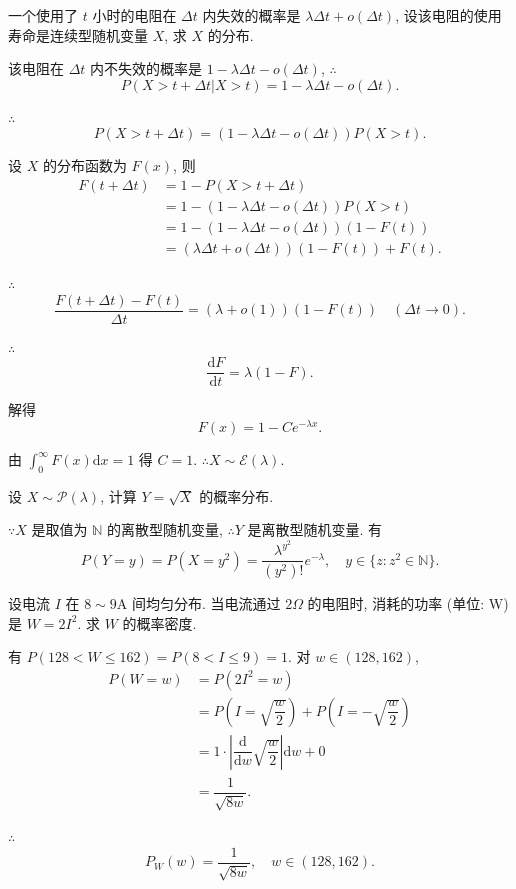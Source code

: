 \documentclass[color=black,device=normal,lang=cn]{elegantnote}
\numberwithin{equation}{section}
\theoremstyle{plain}
\numberwithin{exercise}{exsection}
\begin{document}
\addtocounter{exercise}{3}
\begin{exercise}%
    一个使用了 $t$ 小时的电阻在 $\Delta t$ 内失效的概率是 $\lambda\Delta t+o(\Delta t)$, 设该电阻的使用寿命是连续型随机变量 $X$, 求 $X$ 的分布.
\end{exercise}
\begin{solution}
    该电阻在 $\Delta t$ 内不失效的概率是 $1-\lambda\Delta t-o(\Delta t)$, $\therefore$
    \[P(X>t+\Delta t|X>t)=1-\lambda\Delta t-o(\Delta t).\]

    $\therefore$
    \[P(X>t+\Delta t)=(1-\lambda\Delta t-o(\Delta t))P(X>t).\]

    设 $X$ 的分布函数为 $F(x)$, 则
    \begin{align*}
        F(t+\Delta t) & =1-P(X>t+\Delta t) \\
        & =1-(1-\lambda\Delta t-o(\Delta t))P(X>t) \\
        & =1-(1-\lambda\Delta t-o(\Delta t))(1-F(t)) \\
        & =(\lambda\Delta t+o(\Delta t))(1-F(t))+F(t).
    \end{align*}

    $\therefore$
    \[\dfrac{F(t+\Delta t)-F(t)}{\Delta t}=(\lambda+o(1))(1-F(t))\quad(\Delta t\to0).\]

    $\therefore$
    \[\dfrac{\mathrm{d}F}{\mathrm{d}t}=\lambda(1-F).\]

    解得
    \[F(x)=1-Ce^{-\lambda x}.\]

    由 $\int_0^\infty F(x)\mathrm{d}x=1$ 得 $C=1$. $\therefore X\sim\mathcal{E}(\lambda)$.
\end{solution}
\begin{exercise}%
    设 $X\sim\mathcal{P}(\lambda)$, 计算 $Y=\sqrt{X}$ 的概率分布.
\end{exercise}
\begin{solution}
    $\because X$ 是取值为 $\mathbb{N}$ 的离散型随机变量, $\therefore Y$ 是离散型随机变量. 有
    \[P(Y=y)=P(X=y^2)=\dfrac{\lambda^{y^2}}{(y^2)!}e^{-\lambda},\quad y\in\{z:z^2\in\mathbb{N}\}.\]
\end{solution}
\begin{exercise}%
    设电流 $I$ 在 $8\sim 9\text{A}$ 间均匀分布. 当电流通过 $2\Omega$ 的电阻时, 消耗的功率 (单位: W) 是 $W=2I^2$. 求 $W$ 的概率密度.
\end{exercise}
\begin{solution}
    有 $P(128<W\leq162)=P(8<I\leq9)=1$. 对 $w\in(128,162)$,
    \begin{align*}
        P(W=w) & =P(2I^2=w) \\
        & =P\left(I=\sqrt{\dfrac{w}{2}}\right)+P\left(I=-\sqrt{\dfrac{w}{2}}\right) \\
        & =1\cdot\left|\dfrac{\mathrm{d}}{\mathrm{d}w}\sqrt{\dfrac{w}{2}}\right|\mathrm{d}w+0 \\
        & =\dfrac{1}{\sqrt{8w}}.
    \end{align*}

    $\therefore$
    \[P_W(w)=\dfrac{1}{\sqrt{8w}},\quad w\in(128,162).\]
\end{solution}
\end{document}
